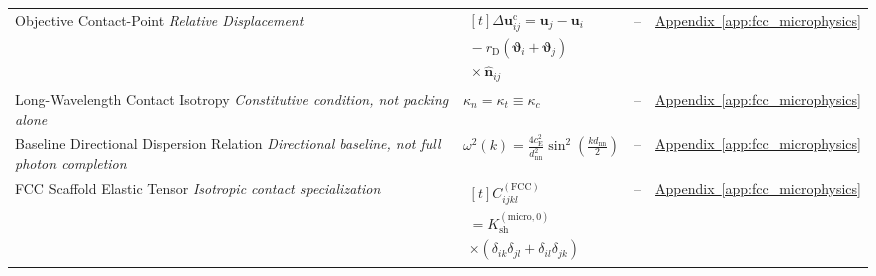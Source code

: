 \begin{longtable}{@{} p{4.5cm} p{6cm} c p{4cm} @{}}
{\raggedright Objective Contact-Point \newline \textit{Relative Displacement}\par} & {\raggedright $\begin{gathered}[t]\Delta\mathbf u_{ij}^{\mathrm c}=\mathbf u_j-\mathbf u_i \\ {}-r_{\mathrm D}(\boldsymbol\vartheta_i+\boldsymbol\vartheta_j) \\ {}\times\widehat{\mathbf n}_{ij}\end{gathered}$\par} & -- & {\raggedright \hyperref[app:fcc_microphysics]{Appendix~\ref*{app:fcc_microphysics}}\par} \\

{\raggedright Long-Wavelength Contact Isotropy \newline \textit{Constitutive condition, not packing alone}\par} & {\raggedright $\kappa_n=\kappa_t\equiv\kappa_c$\par} & -- & {\raggedright \hyperref[app:fcc_microphysics]{Appendix~\ref*{app:fcc_microphysics}}\par} \\

{\raggedright Baseline Directional Dispersion Relation \newline \textit{Directional baseline, not full photon completion}\par} & {\raggedright $\omega^2(k) = \frac{4c_{\mathrm{E}}^2}{d_{\mathrm{nn}}^2} \sin^2\left( \frac{kd_{\mathrm{nn}}}{2} \right)$\par} & -- & {\raggedright \hyperref[app:fcc_microphysics]{Appendix~\ref*{app:fcc_microphysics}}\par} \\

{\raggedright FCC Scaffold Elastic Tensor \newline \textit{Isotropic contact specialization}\par} & {\raggedright $\begin{gathered}[t]C_{ijkl}^{(\mathrm{FCC})} \\ =K_{\mathrm{sh}}^{(\mathrm{micro},0)} \\ \times(\delta_{ik}\delta_{jl}+\delta_{il}\delta_{jk})\end{gathered}$\par} & -- & {\raggedright \hyperref[app:fcc_microphysics]{Appendix~\ref*{app:fcc_microphysics}}\par} \\


\end{longtable}
